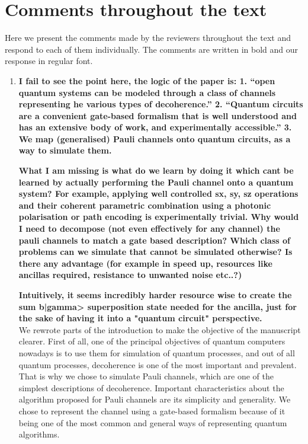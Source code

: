\documentclass[10pt,letterpaper]{article} %
\begin{document}
\section*{Comments throughout the text}

Here we present the comments made by the reviewers throughout the text 
and respond to each of them individually.
The comments are written in bold and our response in regular font.

\begin{enumerate}
\item \textbf{I fail to see the point here, the logic of the paper is: 
1. ``open quantum systems can be modeled through a class of channels representing he various types of decoherence.'' 2. ``Quantum circuits are a convenient gate-based formalism that is well understood and has an extensive body of work, and experimentally accessible.''
3. We map (generalised) Pauli channels onto quantum circuits, as a way to simulate them.} 

\textbf{What I am missing is what do we learn by doing it which cant be learned by actually performing the Pauli channel onto a quantum system? For example, applying well controlled sx, sy, sz operations and their coherent parametric combination using a photonic polarisation or path encoding is experimentally trivial. Why would I need to decompose (not even effectively for any channel) the pauli channels to match a gate based description? Which class of problems can we simulate that cannot be simulated otherwise? Is there any advantage (for example in speed up, resources like ancillas required, resistance to unwanted noise etc..?)}

\textbf{Intuitively, it seems incredibly harder resource wise to create the sum b|gamma> superposition state needed for the ancilla, just for the sake of having it into a "quantum circuit" perspective. }\\


We rewrote parts of the introduction to make the objective of the manuscript clearer. 
First of all, one of the principal objectives of quantum computers nowadays
is to use them for simulation of quantum processes,
and out of all quantum processes, decoherence is one of the most important and prevalent.
That is why we chose to simulate Pauli channels, which are one of the
simplest descriptions of decoherence. 
Important characteristics about the algorithm proposed for Pauli channels
are its simplicity and generality.
We chose to represent the channel using a gate-based formalism because
of it being one of the most common and general ways of
representing quantum algorithms.


\end{enumerate}
\end{document}
